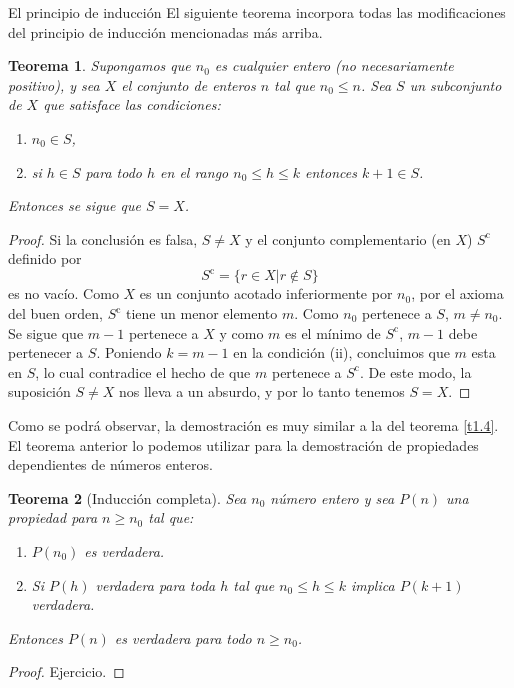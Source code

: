 \documentclass[11pt,spanish,makeidx]{amsbook}
\newtheorem{teorema}{Teorema}[section]
\theoremstyle{definition}
\theoremstyle{remark}
\begin{document}
\begin{section}{El principio de inducción}
El siguiente teorema incorpora todas las modificaciones del principio de inducción mencionadas más arriba.

\begin{teorema} Supongamos que $n_0$ es cualquier entero (no necesariamente positivo), y sea $X$ el conjunto de enteros $n$ tal que $ n_0 \le n$. Sea $S$ un subconjunto de $X$ que satisface las condiciones: 
\begin{enumerate}
\item[(i)] $n_0 \in S$,
\item[(ii)] si $h\in S$ para todo $h$ en el rango $n_0 \le h \le k$ entonces $k+1 \in S$.
\end{enumerate}
Entonces se sigue que $S=X$.
\end{teorema}
\begin{proof}
Si la conclusión es falsa, $S \not= X$ y el conjunto complementario (en $X$)  $S^{\text{c}}$ definido por
$$
S^{\text{c}}= \{ r \in X | r\not\in S\}
$$
es no vacío. Como $X$ es un conjunto acotado inferiormente por $n_0$, por el axioma del buen orden, $S^{\text{c}}$ tiene un menor elemento $m$. Como $n_0$ pertenece a $S$, $m\not=n_0$. Se sigue que $m-1$ pertenece a $X$ y como $m$ es el mínimo de $S^{\text{c}}$, $m-1$ debe pertenecer a $S$. Poniendo $k=m-1$ en la condición (ii), concluimos que $m$ esta en $S$, lo cual contradice el hecho de que $m$ pertenece a $S^{\text{c}}$. De este modo, la suposición $S \not= X$ nos lleva a un absurdo, y por lo tanto tenemos $S= X$.
\end{proof}

Como se podrá observar, la demostración es muy similar a  la del teorema \ref{t1.4}. El teorema anterior lo podemos utilizar para la demostración de propiedades dependientes de números enteros.

\begin{teorema}[Inducción completa]\label{ind-completa} Sea $n_0$ número entero y sea $P(n)$ una propiedad para $n \ge n_0$ tal que:
\begin{enumerate}
\item[(1)] $P(n_0)$ es verdadera.
\item[(2)] Si $P(h)$ verdadera para toda $h$ tal que $n_0 \le h \le k$ implica $P(k + 1)$ verdadera.
\end{enumerate}
Entonces $P(n)$ es verdadera para todo $n \ge n_0$.
\end{teorema}
\begin{proof} Ejercicio.
\end{proof}


\end{section}
\end{document}
